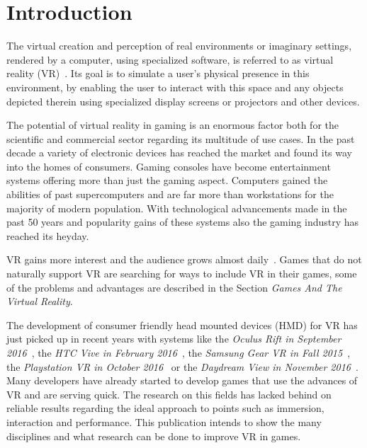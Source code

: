 \section{Introduction}

The virtual creation and perception of real environments or imaginary settings, rendered by a computer, using specialized software, is referred to as virtual reality (VR)~\cite{online:def:vr}. Its goal is to simulate a user's physical presence in this environment, by enabling the user to interact with this space and any objects depicted therein using specialized display screens or projectors and other devices.

The potential of virtual reality in gaming is an enormous factor both for the scientific and commercial sector regarding its multitude of use cases. \newline
In the past decade a variety of electronic devices has reached the market and found its way into the homes of consumers. Gaming consoles have become entertainment systems offering more than just the gaming aspect. Computers gained the abilities of past supercomputers and are far more than workstations for the majority of modern population. With technological advancements made in the past 50 years and popularity gains of these systems also the gaming industry has reached its heyday. 

VR gains more interest and the audience grows almost daily~\cite{online:gamerStats}. Games that do not naturally support VR are searching for ways to include VR in their games, some of the problems and advantages are described in the Section \textit{Games And The Virtual Reality}.

The development of consumer friendly head mounted devices (HMD) for VR has just picked up in recent years with systems like the \textit{Oculus Rift in September 2016}~\cite{online:releaseOculus}, the \textit{HTC Vive in February 2016}~\cite{online:releaseVive}, the \textit{Samsung Gear VR in Fall 2015}~\cite{online:releaseGearVR}, the \textit{Playstation VR in October 2016}~\cite{online:releasePSVR} or the \textit{Daydream View in November 2016}~\cite{online:releaseGearVR}. \newline
Many developers have already started to develop games that use the advances of VR and are serving quick. The research on this fields has lacked behind on reliable results regarding the ideal approach to points such as immersion, interaction and performance. This publication intends to show the many disciplines and what research can be done to improve VR in games.

